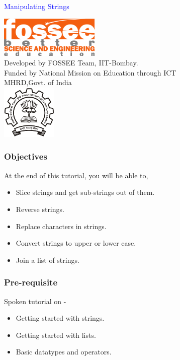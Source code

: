 \documentclass[presentation]{beamer}
\title{}
\author{FOSSEE}
\date{}
\begin{document}
\begin{frame}

\begin{center}
\vspace{12pt}
\textcolor{blue}{\huge Manipulating Strings}
\end{center}
\vspace{18pt}
\begin{center}
\vspace{10pt}
\includegraphics[scale=0.95]{../images/fossee-logo.png}\\
\vspace{5pt}
\scriptsize Developed by FOSSEE Team, IIT-Bombay. \\ 
\scriptsize Funded by National Mission on Education through ICT\\
\scriptsize  MHRD,Govt. of India\\
\includegraphics[scale=0.30]{../images/iitb-logo.png}\\
\end{center}
\end{frame}
\begin{frame}
\frametitle{Objectives}
\label{sec-2}

  At the end of this tutorial, you will be able to,


\begin{itemize}
\item Slice strings and get sub-strings out of them.
\item Reverse strings.
\item Replace characters in strings.
\item Convert strings to upper or lower case.
\item Join a list of strings.
\end{itemize}
\end{frame}
\begin{frame}
\frametitle{Pre-requisite}
\label{sec-3}

Spoken tutorial on -
\begin{itemize}
\item Getting started with strings.
\item Getting started with lists.
\item Basic datatypes and operators.
\end{itemize}
\end{frame}
\end{document}
